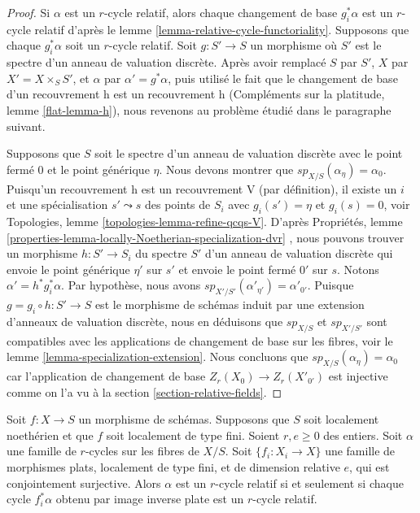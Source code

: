 \begin{proof} 
Si  $\alpha$  est un  $r$-cycle relatif, alors chaque changement de base $g_i^*\alpha$  est
 un  $r$-cycle relatif d'après le lemme  \ref{lemma-relative-cycle-functoriality}. Supposons
 que chaque  $g_i^*\alpha$  soit un  $r$-cycle relatif.
 Soit $g : S' \to S$  un morphisme où  $S'$  est le spectre d'un anneau de 
valuation discrète. Après avoir remplacé  $S$  par  $S'$,  $X$  par $X' = X \times_S S'$, et  
$\alpha$  par  $\alpha' = g^*\alpha$, puis utilisé le fait que le changement de base d'un
 recouvrement h est un recouvrement h (Compléments sur la platitude, lemme \ref{flat-lemma-h}), 
nous revenons au problème étudié dans le paragraphe suivant. 

\medskip\noindent
 Supposons que  $S$  soit le spectre d'un anneau de valuation discrète avec le point 
fermé  $0$  et le point générique  $\eta$. Nous devons montrer que  
$sp_{X/S}(\alpha_\eta) = \alpha_0$. Puisqu'un recouvrement h est un recouvrement
 V (par définition), il existe un  $i$  et une spécialisation  $s' \leadsto s$
  des points de  $S_i$  avec  $g_i(s') = \eta$  et  $g_i(s) = 0$, voir
 Topologies, lemme \ref{topologies-lemma-refine-qcqs-V}. D'après
 Propriétés, lemme  \ref{properties-lemma-locally-Noetherian-specialization-dvr} , nous 
pouvons trouver un morphisme $h : S' \to S_i$ du 
spectre  $S'$  d'un anneau de valuation discrète qui envoie
 le point générique  $\eta'$  sur  $s'$  et envoie
 le point fermé  $0'$  sur  $s$. Notons  $\alpha' = h^*g_i^*\alpha$.
 Par hypothèse, nous avons  $sp_{X'/S'}(\alpha'_{\eta'}) = \alpha'_{0'}$. 
Puisque  $g = g_i \circ h : S' \to S$  est le morphisme de schémas 
induit par une extension d'anneaux de valuation discrète, nous en déduisons que 
$sp_{X/S}$  et  $sp_{X'/S'}$  sont compatibles avec les applications de changement 
de base sur les fibres, voir le lemme  \ref{lemma-specialization-extension}. 
Nous concluons que $sp_{X/S}(\alpha_\eta) = \alpha_0$  car 
l'application de changement de base  $Z_r(X_0) \to Z_r(X'_{0'})$  est injective 
comme on l'a vu à la section  \ref{section-relative-fields}. 
\end{proof} 

\begin{lemma} 
\label{lemma-families-specialization-fppf-descent} 
Soit  $f : X \to S$  un morphisme de schémas. Supposons que  $S$  soit localement noethérien et
 que  $f$  soit localement de type fini. Soient  $r, e \geq 0$  des entiers. 
Soit  $\alpha$  une famille de  $r$-cycles sur les fibres de $X/S$. 
Soit  $\{f_i : X_i \to X\}$  une famille de morphismes
 plats, localement de type fini, et de dimension relative  $e$, qui 
est conjointement surjective. Alors  $\alpha$  est un  $r$-cycle relatif si et seulement si 
chaque cycle $f_i^*\alpha$ obtenu par image inverse plate  est un  $r$-cycle relatif. 
\end{lemma} 

